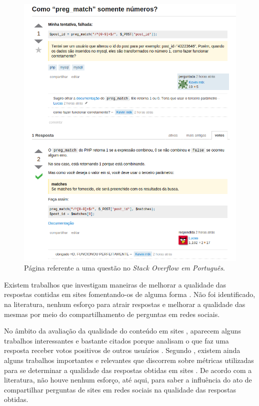     \begin{figure}[H]
        \center
        \includegraphics[scale=.6]{./figuras/exemplo-so-pt.png}
        \caption{Página referente a uma questão no \textit{Stack Overflow em Português}.}
        \label{fig:fig1}
    \end{figure}

Existem trabalhos que investigam maneiras de melhorar a qualidade das respostas contidas em sites \qa fomentando-os de alguma forma \cite{harper2008predictors,chen2010knowledge,jeon2010re}. Não foi identificado, na literatura, nenhum esforço para atrair respostas e melhorar a qualidade das mesmas por meio do compartilhamento de perguntas em redes sociais.

No âmbito da avaliação da qualidade do conteúdo em sites \qanospace, aparecem alguns trabalhos interessantes e bastante citados porque analisam o que faz uma resposta receber votos positivos de outros usuários \cite{gazan2006specialists,harper2009facts}. Segundo \cite{gazan2011social}, existem ainda alguns trabalhos importantes e relevantes que discorrem sobre métricas utilizadas para se determinar a qualidade das respostas obtidas em sites \qanospace. De acordo com a literatura, não houve nenhum esforço, até aqui, para saber a influência do ato de compartilhar perguntas de sites \qa em redes sociais na qualidade das respostas obtidas.


